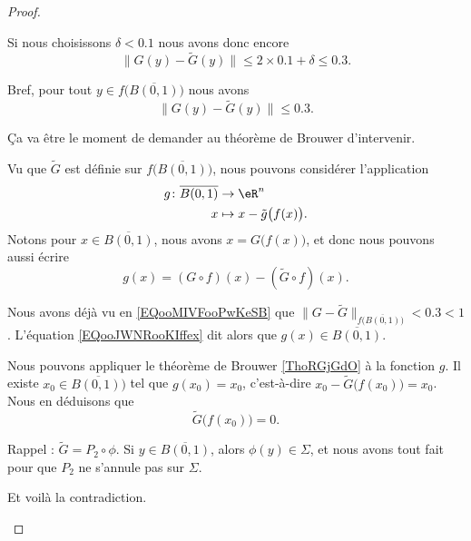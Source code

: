 \begin{proof}
\begin{subproof}
		Si nous choisissons \( \delta<0.1\) nous avons donc encore
		\begin{equation}
			\| G(y)-\tilde G(y) \|\leq 2\times 0.1+\delta\leq 0.3.
		\end{equation}
	\end{subproof}
	Bref, pour tout \( y\in f\big( \overline{B(0,1)} \big)\) nous avons
	\begin{equation}		\label{EQooMIVFooPwKeSB}
		\| G(y)-\tilde  G(y) \|\leq 0.3.
	\end{equation}

	Ça va être le moment de demander au théorème de Brouwer d'intervenir.

	\begin{subproof}
		\spitem[Définition de \( g\)]

		Vu que \( \tilde G\) est définie sur \( f\big( \overline{B(0,1)} \big)\), nous pouvons considérer l'application
		\begin{equation}
			\begin{aligned}
				g\colon \overline{B(0,1)} & \to \eR^n                           \\
				x                         & \mapsto x-\tilde g\big( f(x) \big).
			\end{aligned}
		\end{equation}
		Notons pour \( x\in \overline{B(0,1)}\), nous avons \( x=G\big( f(x) \big)\), et donc nous pouvons aussi écrire
		\begin{equation}		\label{EQooJWNRooKIffex}
			g(x)=(G\circ f)(x)-(\tilde  G\circ f)(x).
		\end{equation}
		\spitem[\( g(x)\in \overline{B(0,1)}\) ]

		Nous avons déjà vu en \eqref{EQooMIVFooPwKeSB} que \( \| G-\tilde G \|_{f\big( \overline{B(0,1)} \big)}< 0.3<1\). L'équation \eqref{EQooJWNRooKIffex} dit alors que \( g(x)\in \overline{B(0,1)}\).

		\spitem[Brouwer]
		Nous pouvons appliquer le théorème de Brouwer \eqref{ThoRGjGdO} à la fonction \( g\). Il existe \( x_0\in \overline{B(0,1))}\) tel que \( g(x_0)=x_0\), c'est-à-dire \( x_0-\tilde G\big( f(x_0) \big)=x_0\). Nous en déduisons que
		\begin{equation}
			\tilde G\big( f(x_0) \big)=0.
		\end{equation}

		\spitem[La contradiction]
		Rappel : \( \tilde G=P_2\circ \phi\). Si \( y\in \overline{B(0,1)}\), alors \( \phi(y)\in \Sigma\), et nous avons tout fait pour que \( P_2\) ne s'annule pas sur \( \Sigma\).

		Et voilà la contradiction.

	\end{subproof}
\end{proof}

